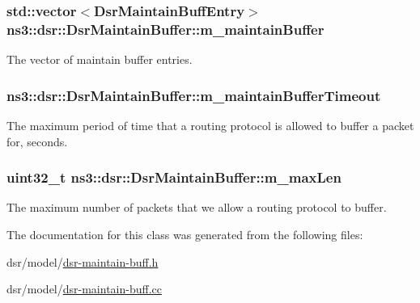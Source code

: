 \subsubsection[{\texorpdfstring{m\+\_\+maintain\+Buffer}{m_maintainBuffer}}]{\setlength{\rightskip}{0pt plus 5cm}std\+::vector$<${\bf Dsr\+Maintain\+Buff\+Entry}$>$ ns3\+::dsr\+::\+Dsr\+Maintain\+Buffer\+::m\+\_\+maintain\+Buffer\hspace{0.3cm}{\ttfamily [private]}}\hypertarget{classns3_1_1dsr_1_1DsrMaintainBuffer_a942fc86793c5a6f538a9f0bd69709ce9}{}\label{classns3_1_1dsr_1_1DsrMaintainBuffer_a942fc86793c5a6f538a9f0bd69709ce9}


The vector of maintain buffer entries. 

\subsubsection[{\texorpdfstring{m\+\_\+maintain\+Buffer\+Timeout}{m_maintainBufferTimeout}}]{ ns3\+::dsr\+::\+Dsr\+Maintain\+Buffer\+::m\+\_\+maintain\+Buffer\+Timeout\hspace{0.3cm}{\ttfamily [private]}}\hypertarget{classns3_1_1dsr_1_1DsrMaintainBuffer_a054cbdee77cd0a61520726c2fc72912c}{}\label{classns3_1_1dsr_1_1DsrMaintainBuffer_a054cbdee77cd0a61520726c2fc72912c}


The maximum period of time that a routing protocol is allowed to buffer a packet for, seconds. 

\subsubsection[{\texorpdfstring{m\+\_\+max\+Len}{m_maxLen}}]{\setlength{\rightskip}{0pt plus 5cm}uint32\+\_\+t ns3\+::dsr\+::\+Dsr\+Maintain\+Buffer\+::m\+\_\+max\+Len\hspace{0.3cm}{\ttfamily [private]}}\hypertarget{classns3_1_1dsr_1_1DsrMaintainBuffer_a497cea8ef3a7d5ee9db88e8cc0b8a365}{}\label{classns3_1_1dsr_1_1DsrMaintainBuffer_a497cea8ef3a7d5ee9db88e8cc0b8a365}


The maximum number of packets that we allow a routing protocol to buffer. 



The documentation for this class was generated from the following files\+:\begin{DoxyCompactItemize}
\item 
dsr/model/\hyperlink{dsr-maintain-buff_8h}{dsr-\/maintain-\/buff.\+h}\item 
dsr/model/\hyperlink{dsr-maintain-buff_8cc}{dsr-\/maintain-\/buff.\+cc}\end{DoxyCompactItemize}
